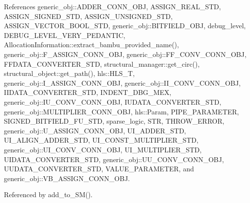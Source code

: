 References generic\+\_\+obj\+::\+A\+D\+D\+E\+R\+\_\+\+C\+O\+N\+N\+\_\+\+O\+BJ, A\+S\+S\+I\+G\+N\+\_\+\+R\+E\+A\+L\+\_\+\+S\+TD, A\+S\+S\+I\+G\+N\+\_\+\+S\+I\+G\+N\+E\+D\+\_\+\+S\+TD, A\+S\+S\+I\+G\+N\+\_\+\+U\+N\+S\+I\+G\+N\+E\+D\+\_\+\+S\+TD, A\+S\+S\+I\+G\+N\+\_\+\+V\+E\+C\+T\+O\+R\+\_\+\+B\+O\+O\+L\+\_\+\+S\+TD, generic\+\_\+obj\+::\+B\+I\+T\+F\+I\+E\+L\+D\+\_\+\+O\+BJ, debug\+\_\+level, D\+E\+B\+U\+G\+\_\+\+L\+E\+V\+E\+L\+\_\+\+V\+E\+R\+Y\+\_\+\+P\+E\+D\+A\+N\+T\+IC, Allocation\+Information\+::extract\+\_\+bambu\+\_\+provided\+\_\+name(), generic\+\_\+obj\+::\+F\+\_\+\+A\+S\+S\+I\+G\+N\+\_\+\+C\+O\+N\+N\+\_\+\+O\+BJ, generic\+\_\+obj\+::\+F\+F\+\_\+\+C\+O\+N\+V\+\_\+\+C\+O\+N\+N\+\_\+\+O\+BJ, F\+F\+D\+A\+T\+A\+\_\+\+C\+O\+N\+V\+E\+R\+T\+E\+R\+\_\+\+S\+TD, structural\+\_\+manager\+::get\+\_\+circ(), structural\+\_\+object\+::get\+\_\+path(), hls\+::\+H\+L\+S\+\_\+T, generic\+\_\+obj\+::\+I\+\_\+\+A\+S\+S\+I\+G\+N\+\_\+\+C\+O\+N\+N\+\_\+\+O\+BJ, generic\+\_\+obj\+::\+I\+I\+\_\+\+C\+O\+N\+V\+\_\+\+C\+O\+N\+N\+\_\+\+O\+BJ, I\+I\+D\+A\+T\+A\+\_\+\+C\+O\+N\+V\+E\+R\+T\+E\+R\+\_\+\+S\+TD, I\+N\+D\+E\+N\+T\+\_\+\+D\+B\+G\+\_\+\+M\+EX, generic\+\_\+obj\+::\+I\+U\+\_\+\+C\+O\+N\+V\+\_\+\+C\+O\+N\+N\+\_\+\+O\+BJ, I\+U\+D\+A\+T\+A\+\_\+\+C\+O\+N\+V\+E\+R\+T\+E\+R\+\_\+\+S\+TD, generic\+\_\+obj\+::\+M\+U\+L\+T\+I\+P\+L\+I\+E\+R\+\_\+\+C\+O\+N\+N\+\_\+\+O\+BJ, hls\+::\+Param, P\+I\+P\+E\+\_\+\+P\+A\+R\+A\+M\+E\+T\+ER, S\+I\+G\+N\+E\+D\+\_\+\+B\+I\+T\+F\+I\+E\+L\+D\+\_\+\+F\+U\+\_\+\+S\+TD, sparse\+\_\+logic, S\+TR, T\+H\+R\+O\+W\+\_\+\+E\+R\+R\+OR, generic\+\_\+obj\+::\+U\+\_\+\+A\+S\+S\+I\+G\+N\+\_\+\+C\+O\+N\+N\+\_\+\+O\+BJ, U\+I\+\_\+\+A\+D\+D\+E\+R\+\_\+\+S\+TD, U\+I\+\_\+\+A\+L\+I\+G\+N\+\_\+\+A\+D\+D\+E\+R\+\_\+\+S\+TD, U\+I\+\_\+\+C\+O\+N\+S\+T\+\_\+\+M\+U\+L\+T\+I\+P\+L\+I\+E\+R\+\_\+\+S\+TD, generic\+\_\+obj\+::\+U\+I\+\_\+\+C\+O\+N\+V\+\_\+\+C\+O\+N\+N\+\_\+\+O\+BJ, U\+I\+\_\+\+M\+U\+L\+T\+I\+P\+L\+I\+E\+R\+\_\+\+S\+TD, U\+I\+D\+A\+T\+A\+\_\+\+C\+O\+N\+V\+E\+R\+T\+E\+R\+\_\+\+S\+TD, generic\+\_\+obj\+::\+U\+U\+\_\+\+C\+O\+N\+V\+\_\+\+C\+O\+N\+N\+\_\+\+O\+BJ, U\+U\+D\+A\+T\+A\+\_\+\+C\+O\+N\+V\+E\+R\+T\+E\+R\+\_\+\+S\+TD, V\+A\+L\+U\+E\+\_\+\+P\+A\+R\+A\+M\+E\+T\+ER, and generic\+\_\+obj\+::\+V\+B\+\_\+\+A\+S\+S\+I\+G\+N\+\_\+\+C\+O\+N\+N\+\_\+\+O\+BJ.



Referenced by add\+\_\+to\+\_\+\+S\+M().

